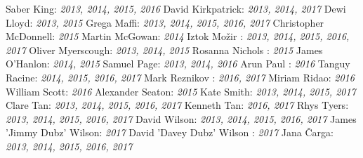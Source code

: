 \begin{fullwidth}
\begin{multicols}{2}
Saber King: \textsl{2013, 2014, 2015, 2016 }
\newline
David Kirkpatrick: \textsl{2013, 2014, 2017 }
\newline
Dewi Lloyd: \textsl{2013, 2015 }
\newline
Grega Maffi: \textsl{2013, 2014, 2015, 2016, 2017 }
\newline
Christopher McDonnell: \textsl{2015 }
\newline
Martin McGowan: \textsl{2014 }
\newline
Iztok Mo\v{z}ir : \textsl{2013, 2014, 2015, 2016, 2017 }
\newline
Oliver Myerscough: \textsl{2013, 2014, 2015 }
\newline
Rosanna Nichols : \textsl{2015 }
\newline
James O'Hanlon: \textsl{2014, 2015 }
\newline
Samuel Page: \textsl{2013, 2014, 2016 }
\newline
Arun Paul : \textsl{2016 }
\newline
Tanguy Racine: \textsl{2014, 2015, 2016, 2017 }
\newline
Mark Reznikov : \textsl{2016, 2017 }
\newline
Miriam Ridao: \textsl{2016 }
\newline
William Scott: \textsl{2016 }
\newline
Alexander Seaton: \textsl{2015 }
\newline
Kate Smith: \textsl{2013, 2014, 2015, 2017 }
\newline
Clare Tan: \textsl{2013, 2014, 2015, 2016, 2017 }
\newline
Kenneth Tan: \textsl{2016, 2017 }
\newline
Rhys Tyers: \textsl{2013, 2014, 2015, 2016, 2017 }
\newline
David Wilson: \textsl{2013, 2014, 2015, 2016, 2017 }
\newline
James 'Jimmy Dubz' Wilson: \textsl{2017 }
\newline
David 'Davey Dubz' Wilson : \textsl{2017 }
\newline
Jana \v{C}arga: \textsl{2013, 2014, 2015, 2016, 2017 }
\newline
\end{multicols} \end{fullwidth} 
